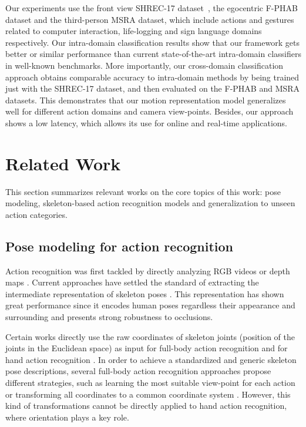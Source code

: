 \documentclass[letterpaper, 10 pt, conference]{ieeeconf}
\begin{document}
Our experiments use the front view SHREC-17 dataset~\cite{de2017shrec}, the egocentric F-PHAB dataset \cite{garcia2018first} and the third-person MSRA \cite{sun2015cascaded} dataset, which include actions and gestures related to computer interaction, life-logging and sign language domains respectively.
Our intra-domain classification results show that our framework gets better or similar performance than current state-of-the-art intra-domain classifiers in well-known benchmarks.
More importantly, our cross-domain classification approach obtains comparable accuracy to intra-domain methods by being trained just with the SHREC-17 dataset, and then evaluated on the F-PHAB and MSRA datasets. This demonstrates that our motion representation model generalizes well for different action domains and camera view-points.
Besides, our approach shows a low latency, which allows its use for online and real-time applications.


\section{Related Work}

This section summarizes relevant works on the core topics of this work: pose modeling, skeleton-based action recognition models and generalization to unseen action categories. 


\subsection{Pose modeling for action recognition}
Action recognition was first tackled by directly analyzing RGB videos \cite{feichtenhofer2016convolutional} or depth maps \cite{oreifej2013hon4d}. Current approaches have settled the standard of extracting the intermediate representation of skeleton poses \cite{zhang2016efficient, yang2019make}. This representation has shown great performance since it encodes human poses regardless their appearance and surrounding and presents strong robustness to occlusions.
 

Certain works directly use the raw coordinates of skeleton joints (position of the joints in the Euclidean space) as input for full-body action recognition \cite{perez2019interaction, liu2019ntu} and for hand action recognition \cite{hou2018spatial, ma2020skeleton, li2021two}. 
In order to achieve a standardized and generic skeleton pose descriptions, several full-body action recognition approaches propose different strategies, such as learning the most suitable view-point for each action \cite{zhang2019view} or transforming all coordinates to a common coordinate system \cite{sabater2021oneshot, su2020predict}. However, this kind of transformations cannot be directly applied to hand action recognition, where orientation plays a key role. 
\end{document}
